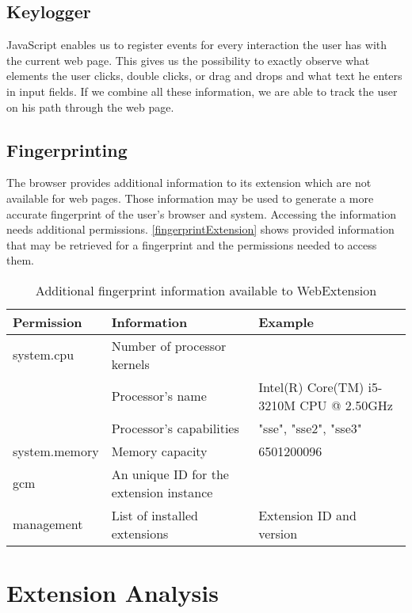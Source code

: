 	
	
\subsection{Keylogger} 
	
	JavaScript enables us to register events for every interaction the user has with the current web page. This gives us the possibility to exactly observe what elements the user clicks, double clicks, or drag and drops and what text he enters in input fields. If we combine all these information, we are able to track the user on his path through the web page. 
	
	
	
\subsection{Fingerprinting} 
	
	The browser provides additional information to its extension which are not available for web pages. Those information may be used to generate a more accurate fingerprint of the user's browser and system. Accessing the information needs additional permissions. \autoref{fingerprintExtension} shows provided information that may be retrieved for a fingerprint and the permissions needed to access them. \\
	
	\begin{table}[h]
		\begin{tabular}{|l|l|l|} \hline
			\textbf{Permission} & \textbf{Information} & \textbf{Example} \\ \hline
			system.cpu & Number of processor kernels & \\
			& Processor's name & Intel(R) Core(TM) i5-3210M CPU @ 2.50GHz \\
			& Processor's capabilities & "sse", "sse2", "sse3"  \\ \hline
			system.memory & Memory capacity & 6501200096 \\ \hline
			gcm & An unique ID for the extension instance & \\ \hline
			management & List of installed extensions & Extension ID and version \\ \hline
		\end{tabular}
		\caption{Additional fingerprint information available to WebExtension}
		\label{fingerprintExtension}
	\end{table} 
	

\section{Extension Analysis}